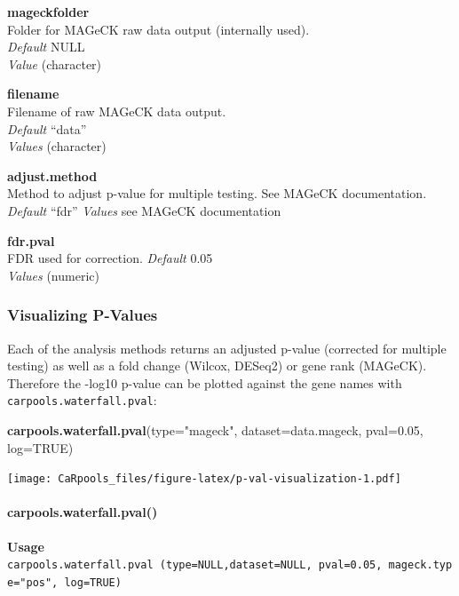 \documentclass[]{article}
\newenvironment{Shaded}{\begin{snugshade}}{\end{snugshade}}
\newcommand{\KeywordTok}[1]{\textcolor[rgb]{0.13,0.29,0.53}{\textbf{{#1}}}}
\newcommand{\DataTypeTok}[1]{\textcolor[rgb]{0.13,0.29,0.53}{{#1}}}
\newcommand{\FloatTok}[1]{\textcolor[rgb]{0.00,0.00,0.81}{{#1}}}
\newcommand{\StringTok}[1]{\textcolor[rgb]{0.31,0.60,0.02}{{#1}}}
\newcommand{\OtherTok}[1]{\textcolor[rgb]{0.56,0.35,0.01}{{#1}}}
\newcommand{\NormalTok}[1]{{#1}}
\let\oldparagraph\paragraph
\renewcommand{\paragraph}[1]{\oldparagraph{#1}\mbox{}}
\begin{document}
\textbf{mageckfolder}\\
Folder for MAGeCK raw data output (internally used).\\
\emph{Default} NULL\\
\emph{Value} (character)

\textbf{filename}\\
Filename of raw MAGeCK data output.\\
\emph{Default} ``data''\\
\emph{Values} (character)

\textbf{adjust.method}\\
Method to adjust p-value for multiple testing. See MAGeCK
documentation.\\
\emph{Default} ``fdr'' \emph{Values} see MAGeCK documentation

\textbf{fdr.pval}\\
FDR used for correction. \emph{Default} 0.05\\
\emph{Values} (numeric)

\subsubsection{Visualizing P-Values}\label{visualizing-p-values}

Each of the analysis methods returns an adjusted p-value (corrected for
multiple testing) as well as a fold change (Wilcox, DESeq2) or gene rank
(MAGeCK).\\
Therefore the -log10 p-value can be plotted against the gene names with
\texttt{carpools.waterfall.pval}:

\begin{Shaded}
\begin{Highlighting}[]
\KeywordTok{carpools.waterfall.pval}\NormalTok{(}\DataTypeTok{type=}\StringTok{"mageck"}\NormalTok{, }\DataTypeTok{dataset=}\NormalTok{data.mageck, }\DataTypeTok{pval=}\FloatTok{0.05}\NormalTok{, }\DataTypeTok{log=}\OtherTok{TRUE}\NormalTok{)}
\end{Highlighting}
\end{Shaded}

\texttt{[image: CaRpools\_files/figure-latex/p-val-visualization-1.pdf]}

\paragraph{carpools.waterfall.pval()}\label{carpools.waterfall.pval}

\textbf{Usage}\\
\texttt{carpools.waterfall.pval\ (type=NULL,dataset=NULL,\ pval=0.05,\ mageck.type="pos",\ log=TRUE)}
\end{document}
